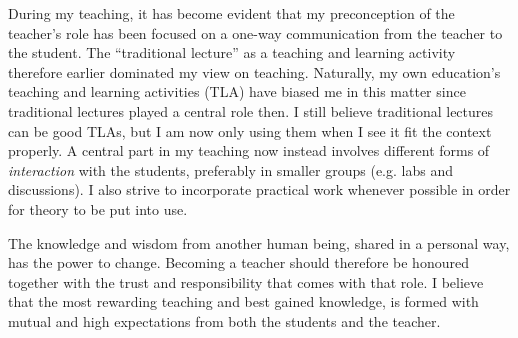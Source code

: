 \documentclass{article}
\begin{document}
During my teaching, it has become evident that my preconception of the teacher’s role has been focused on a one-way communication from the teacher to the student. The “traditional lecture” as a teaching and learning activity therefore earlier dominated my view on teaching. Naturally, my own education’s teaching and learning activities (TLA) have biased me in this matter since traditional lectures played a central role then. I still believe traditional lectures can be good TLAs, but I am now only using them when I see it fit the context properly. A central part in my teaching now instead involves different forms of \textit{interaction} with the students, preferably in smaller groups (e.g. labs and discussions). I also strive to incorporate practical work whenever possible in order for theory to be put into use.

The knowledge and wisdom from another human being, shared in a personal way, has the power to change. Becoming a teacher should therefore be honoured together with the trust and responsibility that comes with that role. I believe that the most rewarding teaching and best gained knowledge, is formed with mutual and high expectations from both the students and the teacher.
\end{document}

